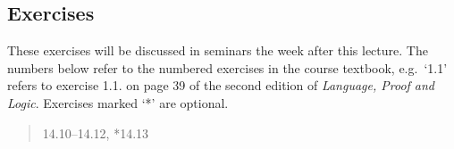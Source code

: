 \documentclass[12pt]{extarticle}
\begin{document}
\begin{multicols*}{3}
\begin{minipage}{\columnwidth}
\section{Exercises}
These exercises will be discussed in seminars the week after this lecture.
The numbers below refer to the numbered exercises in the course textbook, e.g.\ `1.1' refers to exercise 1.1. on page 39 of the second edition of \emph{Language, Proof and Logic}. Exercises marked `*' are optional.
 
\begin{quote}
14.10--14.12, *14.13
 
\end{quote}
\end{minipage}
 


\end{multicols*}
\end{document}
